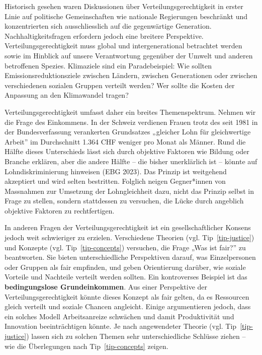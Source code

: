 \documentclass[
  nswissgerman,
  a4paper,
  DIV=11,
  numbers=noendperiod,
  oneside,
  openany]{scrreprt}
\begin{document}
Historisch gesehen waren Diskussionen über Verteilungsgerechtigkeit in
erster Linie auf politische Gemeinschaften wie nationale Regierungen
beschränkt und konzentrierten sich ausschliesslich auf die gegenwärtige
Generation. Nachhaltigkeitsfragen erfordern jedoch eine breitere
Perspektive. Verteilungsgerechtigkeit muss global und intergenerational
betrachtet werden sowie im Hinblick auf unsere Verantwortung gegenüber
der Umwelt und anderen betroffenen Spezies. Klimaziele sind ein
Paradebeispiel: Wie sollten Emissionsreduktionsziele zwischen Ländern,
zwischen Generationen oder zwischen verschiedenen sozialen Gruppen
verteilt werden? Wer sollte die Kosten der Anpassung an den Klimawandel
tragen?

Verteilungsgerechtigkeit umfasst daher ein breites Themenspektrum.
Nehmen wir die Frage des Einkommens. In der Schweiz verdienen Frauen
trotz des seit 1981 in der Bundesverfassung verankerten Grundsatzes
„gleicher Lohn für gleichwertige Arbeit'' im Durchschnitt 1.364 CHF
weniger pro Monat als Männer. Rund die Hälfte dieses Unterschieds lässt
sich durch objektive Faktoren wie Bildung oder Branche erklären, aber
die andere Hälfte -- die bisher unerklärlich ist -- könnte auf
Lohndiskriminierung hinweisen (EBG 2023). Das Prinzip ist weitgehend
akzeptiert und wird selten bestritten. Folglich neigen Gegner*innen von
Massnahmen zur Umsetzung der Lohngleichheit dazu, nicht das Prinzip
selbst in Frage zu stellen, sondern stattdessen zu versuchen, die Lücke
durch angeblich objektive Faktoren zu rechtfertigen.

In anderen Fragen der Verteilungsgerechtigkeit ist ein
gesellschaftlicher Konsens jedoch weit schwieriger zu erzielen.
Verschiedene Theorien (vgl. Tip~\ref{tip-justice}) und Konzepte (vgl.
Tip~\ref{tip-concepts}) versuchen, die Frage „Was ist fair?'' zu
beantworten. Sie bieten unterschiedliche Perspektiven darauf, was
Einzelpersonen oder Gruppen als fair empfinden, und geben Orientierung
darüber, wie soziale Vorteile und Nachteile verteilt werden sollten. Ein
kontroverses Beispiel ist das \textbf{bedingungslose Grundeinkommen}.
Aus einer Perspektive der Verteilungsgerechtigkeit könnte dieses Konzept
als fair gelten, da es Ressourcen gleich verteilt und soziale Chancen
angleicht. Einige argumentieren jedoch, dass ein solches Modell
Arbeitsanreize schwächen und damit Produktivität und Innovation
beeinträchtigen könnte. Je nach angewendeter Theorie (vgl.
Tip~\ref{tip-justice}) lassen sich zu solchen Themen sehr
unterschiedliche Schlüsse ziehen -- wie die Überlegungen nach
Tip~\ref{tip-concepts} zeigen.
\end{document}
